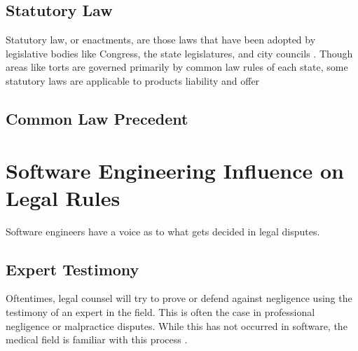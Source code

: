 \subsection{Statutory Law}

Statutory law, or enactments, are those laws that have been adopted by
legislative bodies like Congress, the state legislatures, and city councils
\cite{McAdams07}. Though areas like torts are governed primarily by common law
rules of each state, some statutory laws are applicable to products liability
and offer

\subsection{Common Law Precedent}

\section{Software Engineering Influence on Legal Rules}

Software engineers have a voice as to what gets decided in legal disputes.

\subsection{Expert Testimony}

Oftentimes, legal counsel will try to prove or defend against negligence using
the testimony of an expert in the field. This is often the case in professional
negligence or malpractice disputes. While this has not occurred in software, the
medical field is familiar with this process \cite{Deitschel02}.

